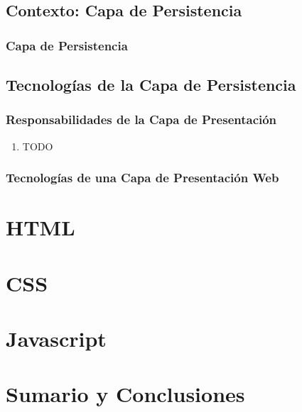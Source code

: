 \documentclass[a4paper,slidestop,xcolor=pst,blue]{beamer}
\begin{document}
\subsection{Contexto: Capa de Persistencia}

\begin{frame}
    \frametitle{Capa de Persistencia}
\end{frame}

\subsection{Tecnologías de la Capa de Persistencia}

\begin{frame}[c]
	\frametitle{Responsabilidades de la Capa de Presentación}
	\begin{enumerate}[<+->]
        \item TODO
	\end{enumerate}
\end{frame}

\begin{frame}[c]
    \frametitle{Tecnologías de una Capa de Presentación Web}
\end{frame}

\section{HTML}

\section{CSS}

\section{Javascript}


\section{Sumario y Conclusiones}
\end{document}
